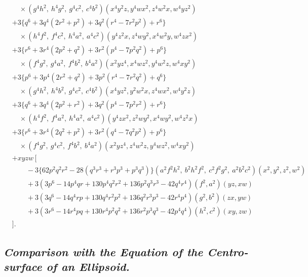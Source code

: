 \documentclass[11pt,a4paper]{article}
\begin{document}
\[\begin{aligned}
& \quad \times (g^4 h^2,\ h^4 g^2,\ g^4 c^2,\ c^4 b^2)(x^4 y^2 z, y^4 w x^2, z^4 w^2 x, w^4 y z^2) \\
& + 3 \bigl\{ q^6 + 3 q^4 (2 r^2 + p^2) + 3 q^2 (r^4 - 7 r^2 p^2) + r^6 \bigr\} \\
& \quad \times (h^4 f^2,\ f^4 c^2,\ h^4 a^2,\ a^4 c^2)(y^4 z^2 x, z^4 w y^2, x^4 w^2 y, w^4 z x^2) \\
& + 3 \bigl\{ r^6 + 3 r^4 (2 p^2 + q^2) + 3 r^2 (p^4 - 7 p^2 q^2) + p^6 \bigr\} \\
& \quad \times (f^4 g^2,\ g^4 a^2,\ f^4 b^2,\ b^4 a^2)(x^2 y z^4, x^4 w z^2, y^4 w^2 z, w^4 x y^2) \\
& + 3 \bigl\{ p^6 + 3 p^4 (2 r^2 + q^2) + 3 p^2 (r^4 - 7 r^2 q^2) + q^6 \bigr\} \\
& \quad \times (g^4 h^2,\ h^4 b^2,\ g^4 c^2,\ c^4 b^2)(x^4 y z^2, y^2 w^2 x, z^4 w x^2, w^4 y^2 z) \\
& + 3 \bigl\{ q^6 + 3 q^4 (2 p^2 + r^2) + 3 q^2 (p^4 - 7 p^2 r^2) + r^6 \bigr\} \\
& \quad \times (h^4 f^2,\ f^4 a^2,\ h^4 a^2,\ a^4 c^2)(y^4 z x^2, z^2 w y^2, x^4 w y^2, w^4 z^2 x) \\
& + 3 \bigl\{ r^6 + 3 r^4 (2 q^2 + p^2) + 3 r^2 (q^4 - 7 q^2 p^2) + p^6 \bigr\} \\
& \quad \times (f^4 g^2,\ g^4 c^2,\ f^4 b^2,\ b^4 a^2)(x^2 y z^4, z^4 w^2 z, y^4 w z^2, w^4 x y^2) \\
& + xyzw \, \bigl[ \\
& \qquad - 3 \bigl\{ 62 p^2 q^2 r^2 - 28 (q^3 r^3 + r^3 p^3 + p^3 q^3) \bigr\}
   (a^2 f^2 h^2,\ b^2 h^2 f^2,\ c^2 f^2 g^2,\ a^2 b^2 c^2)(x^2, y^2, z^2, w^2) \\
& \qquad + 3 (3 p^6 - 14 p^4 qr + 130 p^4 q^2 r^2 + 136 p^2 q^3 r^3 - 42 q^4 r^4)(f^2, a^2)(yz, xw) \\
& \qquad + 3 (3 q^6 - 14 q^4 rp + 130 q^4 r^2 p^2 + 136 q^2 r^3 p^3 - 42 r^4 p^4)(g^2, b^2)(zx, yw) \\
& \qquad + 3 (3 r^6 - 14 r^4 pq + 130 r^4 p^2 q^2 + 136 r^2 p^3 q^3 - 42 p^4 q^4)(h^2, c^2)(xy, zw) \\
& \bigr].
\end{aligned}
\]

\subsection*{\textit{Comparison with the Equation of the Centro-surface of an Ellipsoid.}}
\end{document}
